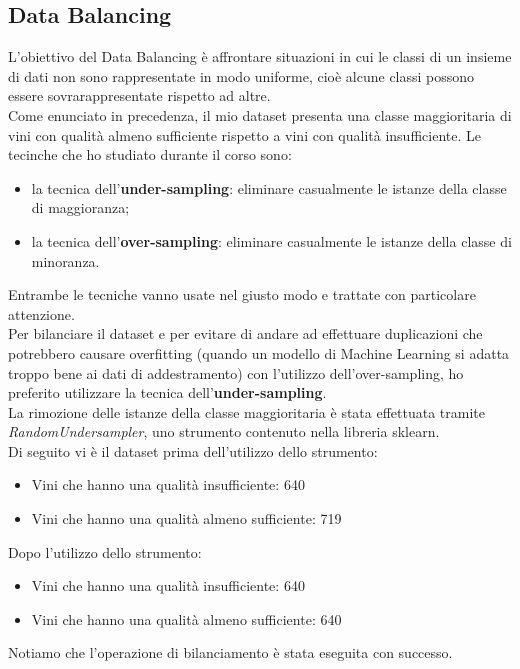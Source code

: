 \documentclass{article}
\begin{document}
\begin{titlepage}
        \subsection{Data Balancing}
        L'obiettivo del Data Balancing è affrontare situazioni in cui le classi di un insieme di dati non sono rappresentate in modo uniforme, cioè alcune classi possono essere sovrarappresentate rispetto ad altre.\\
        Come enunciato in precedenza, il mio dataset presenta una classe maggioritaria di vini con qualità almeno sufficiente rispetto a vini con qualità insufficiente. Le tecinche che ho studiato durante il corso sono:
        \begin{itemize}
            \item la tecnica dell'\textbf{under-sampling}: eliminare casualmente le istanze della classe di maggioranza;
            \item la tecnica dell'\textbf{over-sampling}: eliminare casualmente le istanze della classe di minoranza.
        \end{itemize}
        Entrambe le tecniche vanno usate nel giusto modo e trattate con particolare attenzione.\\ Per bilanciare il dataset e per evitare di andare ad effettuare duplicazioni che potrebbero causare overfitting (quando un modello di Machine Learning si adatta troppo bene ai dati di addestramento) con l'utilizzo dell'over-sampling, ho preferito utilizzare la tecnica dell'\textbf{under-sampling}. \\ La rimozione delle istanze della classe maggioritaria è stata effettuata tramite \textit{RandomUndersampler}, uno strumento contenuto nella libreria sklearn.
        \\ Di seguito vi è il dataset prima dell'utilizzo dello strumento:
        \begin{itemize}
            \item Vini che hanno una qualità insufficiente: 640
            \item Vini che hanno una qualità almeno sufficiente: 719
        \end{itemize}
        Dopo l'utilizzo dello strumento:
        \begin{itemize}
            \item Vini che hanno una qualità insufficiente: 640
            \item Vini che hanno una qualità almeno sufficiente: 640
        \end{itemize}
        Notiamo che l'operazione di bilanciamento è stata eseguita con successo.
        \newpage

\end{titlepage}
\end{document}
